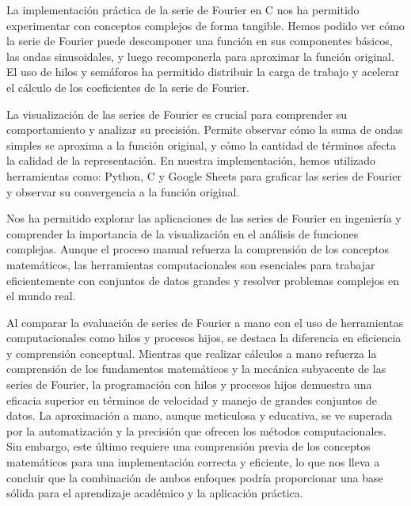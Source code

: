 La implementación práctica de la serie de Fourier en C nos ha permitido experimentar con conceptos complejos de forma tangible. Hemos podido ver cómo la serie de Fourier puede descomponer una función en sus componentes básicos, las ondas sinusoidales, y luego recomponerla para aproximar la función original. El uso de hilos y semáforos ha permitido distribuir la carga de trabajo y acelerar el cálculo de los coeficientes de la serie de Fourier.

La visualización de las series de Fourier es crucial para comprender su comportamiento y analizar su precisión. Permite observar cómo la suma de ondas simples se aproxima a la función original, y cómo la cantidad de términos afecta la calidad de la representación. En nuestra implementación, hemos utilizado herramientas como: Python, C y Google Sheets para graficar las series de Fourier y observar su convergencia a la función original.

Nos ha permitido explorar las aplicaciones de las series de Fourier en ingeniería y comprender la importancia de la visualización en el análisis de funciones complejas. Aunque el proceso manual refuerza la comprensión de los conceptos matemáticos, las herramientas computacionales son esenciales para trabajar eficientemente con conjuntos de datos grandes y resolver problemas complejos en el mundo real.

Al comparar la evaluación de series de Fourier a mano con el uso de herramientas computacionales como hilos y procesos hijos, se destaca la diferencia en eficiencia y comprensión conceptual. Mientras que realizar cálculos a mano refuerza la comprensión de los fundamentos matemáticos y la mecánica subyacente de las series de Fourier, la programación con hilos y procesos hijos demuestra una eficacia superior en términos de velocidad y manejo de grandes conjuntos de datos. La aproximación a mano, aunque meticulosa y educativa, se ve superada por la automatización y la precisión que ofrecen los métodos computacionales. Sin embargo, este último requiere una comprensión previa de los conceptos matemáticos para una implementación correcta y eficiente, lo que nos lleva a concluir que la combinación de ambos enfoques podría proporcionar una base sólida para el aprendizaje académico y la aplicación práctica.

